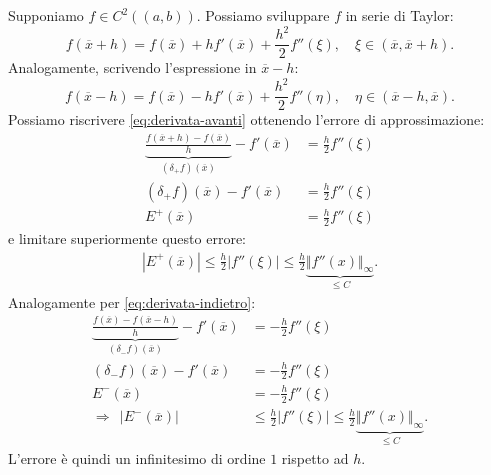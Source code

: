 Supponiamo $f\in C^{2}(( a,b))$.
Possiamo sviluppare $f$ in serie di Taylor:
\begin{equation}
f(\overline{x} +h) =f(\overline{x}) +hf'(\overline{x}) +\frac{h^{2}}{2} f''( \xi ) ,\quad \xi \in (\overline{x} ,\overline{x} +h).
\label{eq:derivata-avanti}
\end{equation}
Analogamente, scrivendo l'espressione in $\overline{x} -h$:
\begin{equation}
f(\overline{x} -h) =f(\overline{x}) -hf'(\overline{x}) +\frac{h^{2}}{2} f''( \eta ) ,\quad \eta \in (\overline{x} -h,\overline{x}).
\label{eq:derivata-indietro}
\end{equation}
Possiamo riscrivere \eqref{eq:derivata-avanti} ottenendo l'errore di approssimazione:
\begin{align*}
\underbrace{\frac{f(\overline{x} +h) -f(\overline{x})}{h}}_{( \delta _{+} f)(\overline{x})} -f'(\overline{x}) & =\frac{h}{2} f''( \xi )\\
( \delta _{+} f)(\overline{x}) -f'(\overline{x}) & =\frac{h}{2} f''( \xi )\\
E^{+}(\overline{x}) & =\frac{h}{2} f''( \xi )
\end{align*}
e limitare superiormente questo errore:
\begin{align*}
 \left| E^{+}(\overline{x})\right| \leqslant \frac{h}{2}| f''( \xi )| \leqslant \frac{h}{2}\underbrace{\Vert f''(x)\Vert _{\infty }}_{\leqslant C} .
\end{align*}
Analogamente per \eqref{eq:derivata-indietro}:
\begin{align*}
\underbrace{\frac{f(\overline{x}) -f(\overline{x} -h)}{h}}_{( \delta _{-} f)(\overline{x})} -f'(\overline{x}) & =-\frac{h}{2} f''( \xi )\\
( \delta _{-} f)(\overline{x}) -f'(\overline{x}) & =-\frac{h}{2} f''( \xi )\\
E^{-}(\overline{x}) & =-\frac{h}{2} f''( \xi ) \\
\Rightarrow \ \ \left| E^{-}(\overline{x})\right| &\leqslant \frac{h}{2}| f''( \xi )| \leqslant \frac{h}{2}\underbrace{\Vert f''(x)\Vert _{\infty }}_{\leqslant C} .
\end{align*}
L'errore è quindi un infinitesimo di ordine $1$ rispetto ad $h$.


